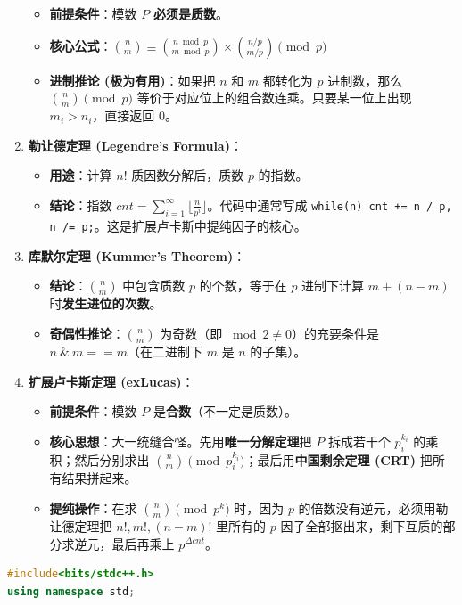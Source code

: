 \documentclass[10pt,landscape,a4paper]{article}
\begin{document}
\begin{multicols*}{3}
\begin{enumerate}[start=1]
\begin{itemize}
\item \textbf{前提条件}：模数 $P$ \textbf{必须是质数}。
\item \textbf{核心公式}：$\binom{n}{m} \equiv \binom{n \bmod p}{m \bmod p} \times \binom{n / p}{m / p} \pmod p$
\item \textbf{进制推论 (极为有用)}：如果把 $n$ 和 $m$ 都转化为 $p$ 进制数，那么 $\binom{n}{m} \pmod p$ 等价于对应位上的组合数连乘。只要某一位上出现 $m_i > n_i$，直接返回 0。
\end{itemize}
\item \textbf{勒让德定理 (Legendre's Formula)}：
\begin{itemize}
\item \textbf{用途}：计算 $n!$ 质因数分解后，质数 $p$ 的指数。
\item \textbf{结论}：指数 $cnt = \sum_{i=1}^{\infty} \lfloor \frac{n}{p^i} \rfloor$。代码中通常写成 \texttt{w\allowbreak{}h\allowbreak{}i\allowbreak{}l\allowbreak{}e\allowbreak{}(\allowbreak{}n\allowbreak{})\allowbreak{} \allowbreak{}c\allowbreak{}n\allowbreak{}t\allowbreak{} \allowbreak{}+\allowbreak{}=\allowbreak{} \allowbreak{}n\allowbreak{} \allowbreak{}/\allowbreak{} \allowbreak{}p\allowbreak{},\allowbreak{} \allowbreak{}n\allowbreak{} \allowbreak{}/\allowbreak{}=\allowbreak{} \allowbreak{}p\allowbreak{};}。这是扩展卢卡斯中提纯因子的核心。
\end{itemize}
\item \textbf{库默尔定理 (Kummer's Theorem)}：
\begin{itemize}
\item \textbf{结论}：$\binom{n}{m}$ 中包含质数 $p$ 的个数，等于在 $p$ 进制下计算 $m + (n-m)$ 时\textbf{发生进位的次数}。
\item \textbf{奇偶性推论}：$\binom{n}{m}$ 为奇数（即 $\bmod 2 \neq 0$）的充要条件是 \textbf{$n \ \& \ m == m$}（在二进制下 $m$ 是 $n$ 的子集）。
\end{itemize}
\item \textbf{扩展卢卡斯定理 (exLucas)}：
\begin{itemize}
\item \textbf{前提条件}：模数 $P$ 是\textbf{合数}（不一定是质数）。
\item \textbf{核心思想}：大一统缝合怪。先用\textbf{唯一分解定理}把 $P$ 拆成若干个 $p_i^{k_i}$ 的乘积；然后分别求出 $\binom{n}{m} \pmod{p_i^{k_i}}$；最后用\textbf{中国剩余定理 (CRT)} 把所有结果拼起来。
\item \textbf{提纯操作}：在求 $\binom{n}{m} \pmod{p^k}$ 时，因为 $p$ 的倍数没有逆元，必须用勒让德定理把 $n!, m!, (n-m)!$ 里所有的 $p$ 因子全部抠出来，剩下互质的部分求逆元，最后再乘上 $p^{\Delta cnt}$。
\end{itemize}
\end{enumerate}
\par{}\par
\begin{lstlisting}[language=C++]
#include<bits/stdc++.h>
using namespace std;


\end{lstlisting}
\end{multicols*}
\end{document}
